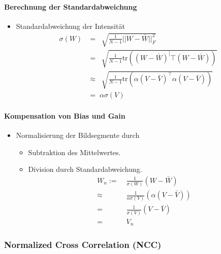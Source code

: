 \documentclass[12pt, a4paper, oneside]{article}
\begin{document}
\paragraph*{Berechnung der Standardabweichung}
\begin{itemize}
  \item Standardabweichung der Intensität
  \begin{align*}
      \sigma(W) & =\;\sqrt[]{\frac{1}{N-1}||W-\bar W||_F^2} \\
      & =\;\sqrt[]{\frac{1}{N-1}\text{tr}((W-\bar W)^]\top (W-\bar W))} \\
      & \approx \;\sqrt[]{\frac{1}{N-1}\text{tr}(\alpha(V-\bar V)^\top\alpha(V-\bar V))} \\
      & =\;\alpha\sigma(V)
  \end{align*}
\end{itemize}

\paragraph*{Kompensation von Bias und Gain}
\begin{itemize}
    \item Normalisierung der Bildsegmente durch
    \begin{itemize}
        \item Subtraktion des Mittelwertes.
        \item Division durch Standardabweichung.
        \begin{align*}
            W_n:= & \;\frac{1}{\sigma(W)}(W-\bar W) \\
            \approx & \;\frac{1}{\alpha\sigma(V)}(\alpha(V-\bar V)) \\
            = & \;\frac{1}{\sigma (V)}(V-\bar V) \\
            = & \;V_n
        \end{align*}
    \end{itemize}
\end{itemize}

\subsubsection{Normalized Cross Correlation (NCC)}
\end{document}
